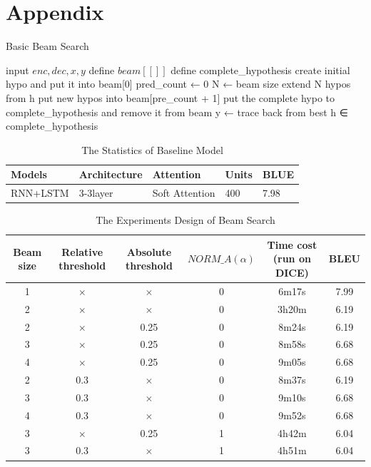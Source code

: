 \documentclass[a4paper]{article}
\begin{document}
\section*{Appendix}

\begin{algorithm}
  \caption{Basic Beam Search}
  \begin{algorithmic}[1]
  \REQUIRE input $enc,dec,x,y$
  \STATE define $beam[[]]$
  \STATE define complete\_hypothesis
  \STATE create initial hypo and put it into beam[0]
  \STATE pred\_count ← 0
  \STATE N ← beam size
     \STATE extend N hypos from h
  \STATE put new hypos into beam[pre\_count + 1]
  \STATE put the complete hypo to complete\_hypothesis and remove it from beam
  \ENDIF
  \ENDFOR
  \ENDWHILE 
  \STATE y ← trace back from best h ∈  complete\_hypothesis
  \end{algorithmic}
\end{algorithm}

\begin{table}[H]
\centering
\caption{The Statistics of Baseline Model}
\label{my-label}
\begin{tabular}{@{}lllll@{}}
\toprule
Models & Architecture & Attention      & Units & BLUE \\ \midrule
RNN+LSTM    & 3-3layer     & Soft Attention & 400   & 7.98          \\ \bottomrule
\end{tabular}
\end{table}

\begin{table}[H]
\centering
\caption{The Experiments Design of Beam Search}
\label{my-label}
\begin{tabular}{c c c c c c}
\toprule
Beam size & Relative threshold & Absolute threshold & $NORM\_A(\alpha)$ & Time cost (run on DICE)& BLEU  \\ 
\midrule
1 & $\times$ & $\times$ & 0 & 6m17s & 7.99 \\
\midrule
2 & $\times$ & $\times$ & 0 & 3h20m & 6.19 \\
2 & $\times$ & 0.25 & 0 & 8m24s & 6.19 \\
3 & $\times$ & 0.25 & 0 & 8m58s & 6.68 \\
4 & $\times$ & 0.25 & 0 & 9m05s & 6.68 \\
\midrule
2 & 0.3 & $\times$ & 0 & 8m37s & 6.19 \\
3 & 0.3 & $\times$ & 0 & 9m10s & 6.68 \\
4 & 0.3 & $\times$ & 0 & 9m52s & 6.68 \\
\midrule
3 & $\times$ & 0.25 & 1 & 4h42m & 6.04 \\
3 & 0.3 & $\times$ & 1 & 4h51m & 6.04 \\
\bottomrule
\end{tabular}
\end{table}
\end{document}
